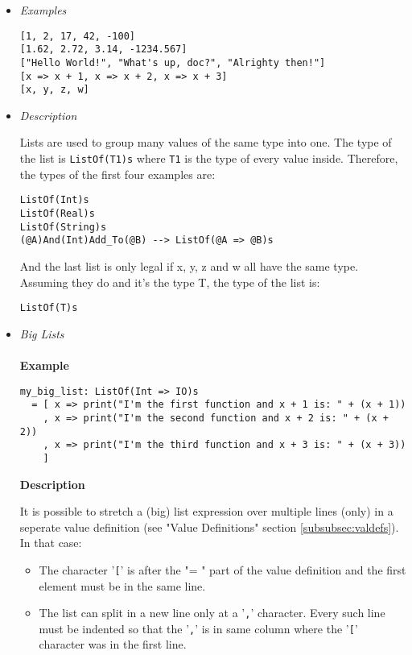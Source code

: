\documentclass{article}
\begin{document}
\begin{itemize}

\item \textit{Examples}
\begin{verbatim}
[1, 2, 17, 42, -100]
[1.62, 2.72, 3.14, -1234.567]
["Hello World!", "What's up, doc?", "Alrighty then!"]
[x => x + 1, x => x + 2, x => x + 3]
[x, y, z, w]
\end{verbatim}

\item \textit{Description}

Lists are used to group many values of the same type into one.  The type of the
list is \verb|ListOf(T1)s| where \verb|T1| is the type of every value inside.
Therefore, the types of the first four examples are:
\begin{verbatim}
ListOf(Int)s
ListOf(Real)s
ListOf(String)s
(@A)And(Int)Add_To(@B) --> ListOf(@A => @B)s
\end{verbatim}
And the last list is only legal if x, y, z and w all have the same type.
Assuming they do and it's the type T, the type of the list is:
\begin{verbatim}
ListOf(T)s
\end{verbatim}

\newpage
\item \textit{Big Lists}
  \\\\
  \textbf{Example}

  \begin{verbatim}
my_big_list: ListOf(Int => IO)s
  = [ x => print("I'm the first function and x + 1 is: " + (x + 1))
    , x => print("I'm the second function and x + 2 is: " + (x + 2))
    , x => print("I'm the third function and x + 3 is: " + (x + 3))
    ]
  \end{verbatim}

  \textbf{Description}

  It is possible to stretch a (big) list expression over multiple lines (only)
  in a seperate value definition (see "Value Definitions" section
  \ref{subsubsec:valdefs}).  In that case:
  \begin{itemize}
  \item
  The character '\verb|[|' is after the "= " part of the value definition
  and the first element must be in the same line.

  \item
  The list can split in a new line only at a '\verb|,|' character. Every such
  line must be indented so that the '\verb|,|' is in same column where the
  '\verb|[|' character was in the first line.


\end{itemize}
\end{itemize}
\end{document}
